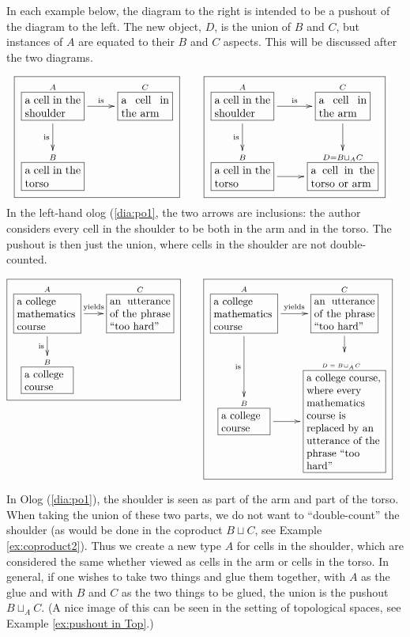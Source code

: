 \documentclass[CT4S-EN-RU]{subfiles}
\begin{document}
\begin{exampleENG}[Pushout]\label{ex:pushout}
In each example below, the diagram to the right is intended to be a pushout of the diagram to the left.  The new object, $D$, is the union of $B$ and $C$, but instances of $A$ are equated to their $B$ and $C$ aspects.  This will be discussed after the two diagrams.

\begin{align}
\label{dia:po1}\fbox{\xymatrixnocompile{\obox{A}{.7in}{a cell in the shoulder}\LA{r}{is}\LAL{d}{is}&\obox{C}{.6in}{a cell in the arm}\\\obox{B}{.7in}{a cell in the torso}}}\hsp&\fbox{\xymatrix{\obox{A}{.7in}{a cell in the shoulder}\LA{r}{is}\LAL{d}{is}&\obox{C}{.6in}{a cell in the arm}\LA{d}{}\\\obox{B}{.7in}{a cell in the torso}\LA{r}{}&\obox{D=B\sqcup_AC}{.8in}{a cell in the torso or arm}}}
\end{align}
In the left-hand olog (\ref{dia:po1}, the two arrows are inclusions: the author considers every cell in the shoulder to be both in the arm and in the torso. The pushout is then just the union, where cells in the shoulder are not double-counted.

\begin{align}\label{dia:po2}\fbox{\xymatrixnocompile@=18pt{\obox{A}{.8in}{\rr a college mathematics course}\LA{r}{yields}\LAL{d}{is}&\obox{C}{.8in}{an utterance of the phrase “too hard”}\\\obox{B}{.6in}{\rr a college course}}}\hsp&\fbox{\xymatrixnocompile@=18pt{\obox{A}{.8in}{\rr a college mathematics course}\LA{r}{yields}\LAL{d}{is}&\obox{C}{.8in}{an utterance of the phrase “too hard”}\LA{d}{}\\\obox{B}{.6in}{\rr a college course}\LA{r}{}&\obox{\parbox{.6in}{\vspace{.1in}\tiny$D=B\!\sqcup_A\!C$}}{1in}{\rr a college course, where every mathematics course is replaced by an utterance of the phrase “too hard”}}}
\end{align}

In Olog (\ref{dia:po1}), the shoulder is seen as part of the arm and part of the torso.  When taking the union of these two parts, we do not want to “double-count” the shoulder (as would be done in the coproduct $B\sqcup C$, see Example \ref{ex:coproduct2}).  Thus we create a new type $A$ for cells in the shoulder, which are considered the same whether viewed as cells in the arm or cells in the torso.  In general, if one wishes to take two things and glue them together, with $A$ as the glue and with $B$ and $C$ as the two things to be glued, the union is the pushout $B\sqcup_AC$. (A nice image of this can be seen in the setting of topological spaces, see Example \ref{ex:pushout in Top}.)


\end{exampleENG}
\end{document}
